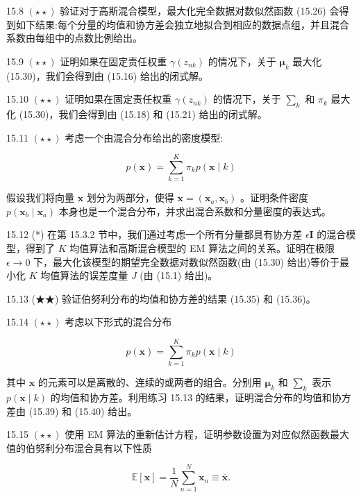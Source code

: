 \documentclass[10pt]{article}
\begin{document}
15.8 \(\left( {\star  \star  }\right)\) 验证对于高斯混合模型，最大化完全数据对数似然函数 (15.26) 会得到如下结果:每个分量的均值和协方差会独立地拟合到相应的数据点组，并且混合系数由每组中的点数比例给出。

15.9 \(\left( {\star  \star  }\right)\) 证明如果在固定责任权重 \(\gamma \left( {z}_{nk}\right)\) 的情况下，关于 \({\mathbf{\mu }}_{k}\) 最大化 (15.30)，我们会得到由 (15.16) 给出的闭式解。

15.10 \(\left( {\star  \star  }\right)\) 证明如果在固定责任权重 \(\gamma \left( {z}_{nk}\right)\) 的情况下，关于 \({\mathbf{\sum }}_{k}\) 和 \({\pi }_{k}\) 最大化 (15.30)，我们会得到由 (15.18) 和 (15.21) 给出的闭式解。

15.11 \(\left( {\star  \star  }\right)\) 考虑一个由混合分布给出的密度模型:

\[
p\left( \mathbf{x}\right)  = \mathop{\sum }\limits_{{k = 1}}^{K}{\pi }_{k}p\left( {\mathbf{x} \mid  k}\right)  \tag{15.63}
\]

假设我们将向量 \(\mathbf{x}\) 划分为两部分，使得 \(\mathbf{x} = \left( {{\mathbf{x}}_{a},{\mathbf{x}}_{b}}\right)\) 。证明条件密度 \(p\left( {{\mathbf{x}}_{b} \mid  {\mathbf{x}}_{a}}\right)\) 本身也是一个混合分布，并求出混合系数和分量密度的表达式。

15.12 (*) 在第 15.3.2 节中，我们通过考虑一个所有分量都具有协方差 \(\epsilon \mathbf{I}\) 的混合模型，得到了 \(K\) 均值算法和高斯混合模型的 EM 算法之间的关系。证明在极限 \(\epsilon  \rightarrow  0\) 下，最大化该模型的期望完全数据对数似然函数(由 (15.30) 给出)等价于最小化 \(K\) 均值算法的误差度量 \(J\) (由 (15.1) 给出)。

15.13 (★★) 验证伯努利分布的均值和协方差的结果 (15.35) 和 (15.36)。

15.14 \(\left( {\star  \star  }\right)\) 考虑以下形式的混合分布

\[
p\left( \mathbf{x}\right)  = \mathop{\sum }\limits_{{k = 1}}^{K}{\pi }_{k}p\left( {\mathbf{x} \mid  k}\right)  \tag{15.64}
\]

其中 \(\mathbf{x}\) 的元素可以是离散的、连续的或两者的组合。分别用 \({\mathbf{\mu }}_{k}\) 和 \({\mathbf{\sum }}_{k}\) 表示 \(p\left( {\mathbf{x} \mid  k}\right)\) 的均值和协方差。利用练习 15.13 的结果，证明混合分布的均值和协方差由 (15.39) 和 (15.40) 给出。

15.15 \(\left( {\star  \star  }\right)\) 使用 EM 算法的重新估计方程，证明参数设置为对应似然函数最大值的伯努利分布混合具有以下性质

\[
\mathbb{E}\left\lbrack  \mathbf{x}\right\rbrack   = \frac{1}{N}\mathop{\sum }\limits_{{n = 1}}^{N}{\mathbf{x}}_{n} \equiv  \overline{\mathbf{x}}. \tag{15.65}
\]
\end{document}
